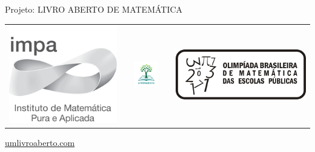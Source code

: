 \documentclass[a4,12pt]{book} %
\begin{document}
\begin{changemargin}{-5cm}{-5cm}
{\fontsize{10}{12}\selectfont
\vspace*{1cm}

\begin{center}
Projeto: LIVRO ABERTO DE MATEMÁTICA

\noindent \begin{tabular}{lcccr}
\includegraphics[scale=.15]{impa}& \quad\quad& \includegraphics[width=3cm]{logo.jpg} & \quad\quad& \includegraphics[scale=.24]{obmep}
\end{tabular}

\url{umlivroaberto.com}
\vspace{.1cm}


\end{center}}
\end{changemargin}
\end{document}
